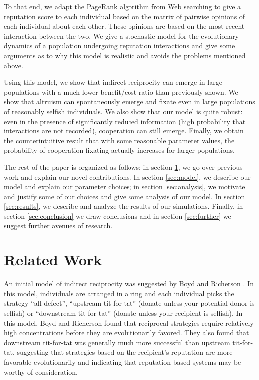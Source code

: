 \documentclass{amsart}
\begin{document}
To that end, we adapt the PageRank algorithm from Web searching to
give a reputation score to each individual based on the matrix of
pairwise opinions of each individual about each other. These opinions
are based on the most recent interaction between the two. We give a
stochastic model for the evolutionary dynamics of a population
undergoing reputation interactions and give some arguments as to why
this model is realistic and avoids the problems mentioned above.

Using this model, we show that indirect reciprocity can emerge in
large populations with a much lower benefit/cost ratio than previously
shown. We show that altruism can spontaneously emerge and fixate even
in large populations of reasonably selfish individuals. We also show
that our model is quite robust: even in the presence of significantly
reduced information (high probability that interactions are not
recorded), cooperation can still emerge. Finally, we obtain the
counterintuitive result that with some reasonable parameter values,
the probability of cooperation fixating actually increases for larger
populations.

The rest of the paper is organized as follows: in section
\ref{sec:related}, we go over previous work and explain our novel
contributions. In section \ref{sec:model}, we describe our model and
explain our parameter choices; in section \ref{sec:analysis}, we
motivate and justify some of our choices and give some analysis of our
model. In section \ref{sec:results}, we describe and analyze the
results of our simulations. Finally, in section \ref{sec:conclusion}
we draw conclusions and in section \ref{sec:further} we suggest
further avenues of research.

\section{Related Work}\label{sec:related}

An initial model of indirect reciprocity was suggested by Boyd and
Richerson \cite{boyd_evolution_1989}. In this model, individuals are
arranged in a ring and each individual picks the strategy ``all
defect'', ``upstream tit-for-tat'' (donate unless your potential donor
is selfish) or ``downstream tit-for-tat'' (donate unless your
recipient is selfish). In this model, Boyd and Richerson found that
reciprocal strategies require relatively high concentrations before
they are evolutionarily favored. They also found that downstream
tit-for-tat was generally much more successful than upstream
tit-for-tat, suggesting that strategies based on the recipient's
reputation are more favorable evolutionarily and indicating that
reputation-based systems may be worthy of consideration.
\end{document}
